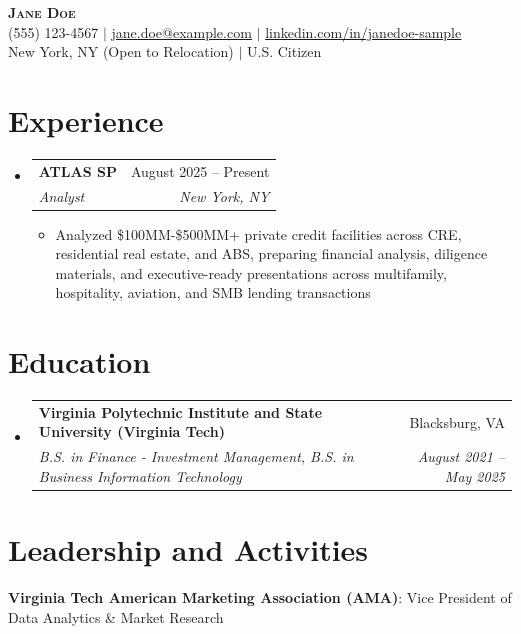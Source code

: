 \documentclass[letterpaper,11pt]{article}
\makeatletter
\newcommand{\resumeItem}[1]{
  \item\small{{#1 \vspace{-2pt}}}
}
\newcommand{\resumeSubheading}[4]{
  \vspace{-2pt}\item
  \begin{tabular*}{0.97\textwidth}[t]{l@{\extracolsep{\fill}}r}
    \textbf{#1} & #2 \\
    \textit{\small#3} & \textit{\small #4} \\
  \end{tabular*}\vspace{-7pt}
}
\newcommand{\resumeSubHeadingListStart}{
  \begin{itemize}[leftmargin=0.15in, label={}]
}
\newcommand{\resumeSubHeadingListEnd}{
  \end{itemize}
}
\newcommand{\resumeItemListStart}{
  \begin{itemize}[leftmargin=*, label=\textbullet]
}
\newcommand{\resumeItemListEnd}{
  \end{itemize}\vspace{-5pt}
}
\makeatother
\begin{document}

\begin{center}
    \textbf{\Huge \scshape Jane Doe} \\ \vspace{1pt}
    \small
    (555) 123-4567 $|$
    \href{mailto:jane.doe@example.com}{\underline{jane.doe@example.com}} $|$
    \href{https://linkedin.com/in/janedoe-sample}{\underline{linkedin.com/in/janedoe-sample}} \\
    New York, NY (Open to Relocation) $|$
    U.S. Citizen
\end{center}

\section{Experience}

\resumeSubHeadingListStart

\resumeSubheading
{ATLAS SP}
{August 2025 -- Present}
{Analyst}
{New York, NY}

\resumeItemListStart

\resumeItem{Analyzed \$100MM-\$500MM+ private credit facilities across CRE, residential real estate, and ABS, preparing financial analysis, diligence materials, and executive-ready presentations across multifamily, hospitality, aviation, and SMB lending transactions}

\resumeItemListEnd

\resumeSubHeadingListEnd

\section{Education}

\resumeSubHeadingListStart

\resumeSubheading
{Virginia Polytechnic Institute and State University (Virginia Tech)}
{Blacksburg, VA}
{B.S. in Finance - Investment Management, B.S. in Business Information Technology}
{August 2021 -- May 2025}

\resumeSubHeadingListEnd

\section{Leadership and Activities}
    \begin{itemize}[leftmargin=0.15in, label={}]
        \small{\item{
            \textbf{Virginia Tech American Marketing Association (AMA)}{: Vice President of Data Analytics \& Market Research} \\
        }}
    \end{itemize}
\end{document}
